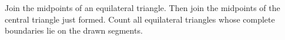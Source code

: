 Join the midpoints of an equilateral triangle. Then join the midpoints of the central triangle just formed. Count all equilateral triangles whose complete boundaries lie on the drawn segments.
